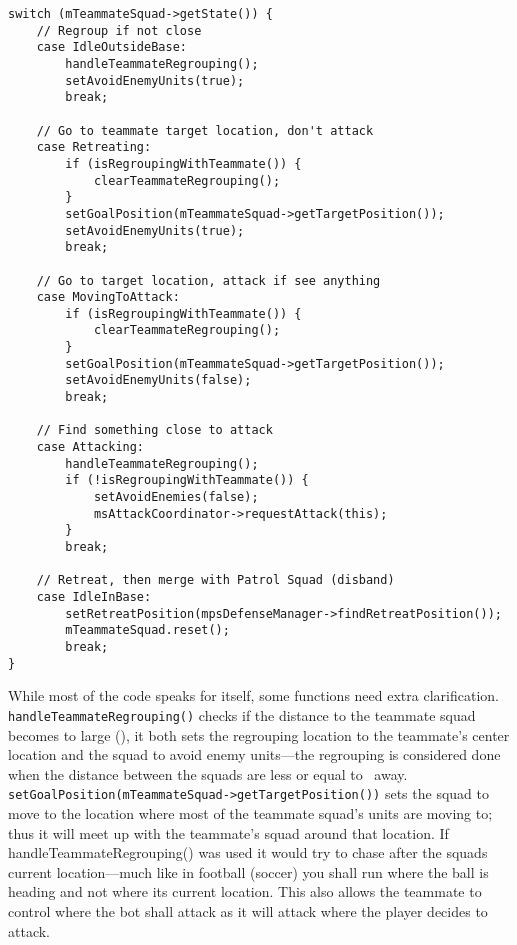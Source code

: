 \begin{lstlisting}[caption={Squad actions depending on the teammate squad's state},label={lst:attack_follow_allied}]
switch (mTeammateSquad->getState()) {
	// Regroup if not close
	case IdleOutsideBase:
		handleTeammateRegrouping();
		setAvoidEnemyUnits(true);
		break;
	
	// Go to teammate target location, don't attack
	case Retreating:
		if (isRegroupingWithTeammate()) {
			clearTeammateRegrouping();
		}
		setGoalPosition(mTeammateSquad->getTargetPosition());
		setAvoidEnemyUnits(true);
		break;

	// Go to target location, attack if see anything
	case MovingToAttack: 
		if (isRegroupingWithTeammate()) {
			clearTeammateRegrouping();
		}
		setGoalPosition(mTeammateSquad->getTargetPosition());
		setAvoidEnemyUnits(false);
		break;

	// Find something close to attack
	case Attacking:
		handleTeammateRegrouping();
		if (!isRegroupingWithTeammate()) {
			setAvoidEnemies(false);
			msAttackCoordinator->requestAttack(this);
		}
		break;

	// Retreat, then merge with Patrol Squad (disband)
	case IdleInBase:
		setRetreatPosition(mpsDefenseManager->findRetreatPosition());
		mTeammateSquad.reset();
		break;
}
\end{lstlisting}
While most of the code speaks for itself, some functions need extra clarification. \texttt{handleTeammateRegrouping()} checks if the distance to the teammate squad becomes to large (\squadAttackAlliedRegroupBegin), it both sets the regrouping location to the teammate's center location and the squad to avoid enemy units—the regrouping is considered done when the distance between the squads are less or equal to \squadAttackAlliedRegroupEnd~away. \texttt{setGoalPosition(mTeammateSquad->getTargetPosition())} sets the squad to move to the location where most of the teammate squad's units are moving to; thus it will meet up with the teammate's squad around that location. If handleTeammateRegrouping() was used it would try to chase after the squads current location—much like in football (soccer) you shall run where the ball is heading and not where its current location. This also allows the teammate to control where the bot shall attack as it will attack where the player decides to attack.

